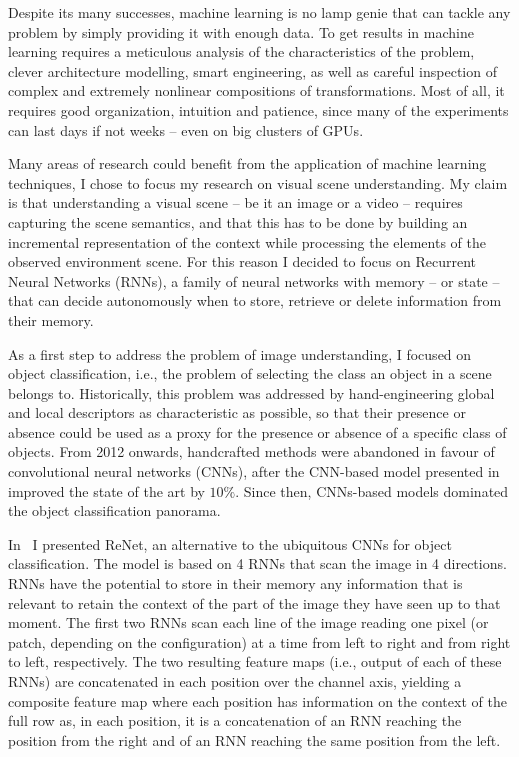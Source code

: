 Despite its many successes, machine learning is no lamp genie that can tackle
any problem by simply providing it with enough data. To get results in machine
learning requires a meticulous analysis of the characteristics of the problem,
clever architecture modelling, smart engineering, as well as careful inspection
of complex and extremely nonlinear compositions of transformations. Most of
all, it requires good organization, intuition and patience, since many of the
experiments can last days if not weeks -- even on big clusters of GPUs.

Many areas of research could benefit from the application of machine learning
techniques, I chose to focus my research on visual scene understanding. My
claim is that understanding a visual scene -- be it an image or a video --
requires capturing the scene semantics, and that this has to be done by
building an incremental representation of the context while processing the
elements of the observed environment scene. For this reason I decided to focus
on Recurrent Neural Networks (RNNs), a family of neural networks with memory --
or state -- that can decide autonomously when to store, retrieve or delete
information from their memory.

As a first step to address the problem of image understanding, I focused on
object classification, i.e., the problem of selecting the class an object in a
scene belongs to. Historically, this problem was addressed by hand-engineering
global and local descriptors as characteristic as possible, so that their
presence or absence could be used as a proxy for the presence or absence of a
specific class of objects. From 2012 onwards, handcrafted methods were
abandoned in favour of convolutional neural networks (CNNs), after the
CNN-based model presented in~\cite{Krizhevsky-2012} improved the state of the
art by $10\%$. Since then, CNNs-based models dominated the object
classification panorama.

In~\cite{visin2015renet} I presented ReNet, an alternative to the ubiquitous
CNNs for object classification. The model is based on 4 RNNs that scan the
image in 4 directions. RNNs have the potential to store in their memory any
information that is relevant to retain the context of the part of the image
they have seen up to that moment. The first two RNNs scan each line of the
image reading one pixel (or patch, depending on the configuration) at a time
from left to right and from right to left, respectively. The two resulting
feature maps (i.e., output of each of these RNNs) are concatenated in each
position over the channel axis, yielding a composite feature map where each
position has information on the context of the full row as, in each position,
it is a concatenation of an RNN reaching the position from the right and of an
RNN reaching the same position from the left.

